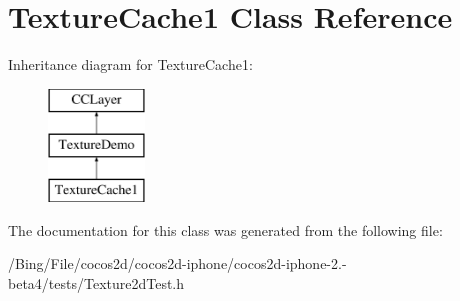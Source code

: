 \hypertarget{interface_texture_cache1}{\section{Texture\-Cache1 Class Reference}
\label{interface_texture_cache1}
}
Inheritance diagram for Texture\-Cache1\-:\begin{figure}[H]
\begin{center}
\leavevmode
\includegraphics[height=3.000000cm]{interface_texture_cache1}
\end{center}
\end{figure}


The documentation for this class was generated from the following file\-:\begin{DoxyCompactItemize}
\item 
/\-Bing/\-File/cocos2d/cocos2d-\/iphone/cocos2d-\/iphone-\/2.-\/beta4/tests/Texture2d\-Test.\-h\end{DoxyCompactItemize}

